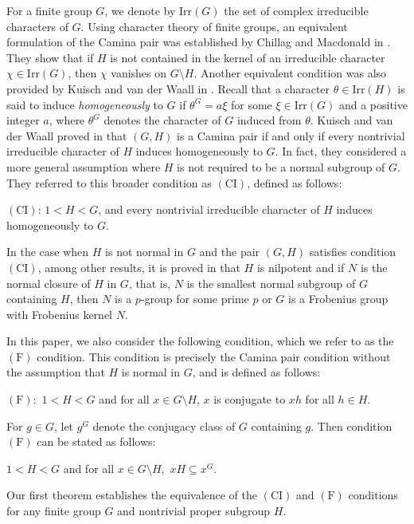 \documentclass[twoside,a4paper,reqno,11pt]{amsart}
\newcommand{\<}{\langle}
\renewcommand{\>}{\rangle}
\newcommand{\Irr}{\mathrm {Irr}}
\newcommand{\F}{\mathrm{(F)}}
\newcommand{\CI}{\mathrm{(CI)}}
\renewcommand{\:}{\colon}
\theoremstyle{definition}
\begin{document}
For a finite group $G$, we denote by $\Irr(G)$ the set of complex irreducible characters of $G$. Using character theory of finite groups, an equivalent formulation of the Camina pair was established by Chillag and Macdonald in \cite[Propsition 3.1]{Chillag-Macdonald}. They show that if $H$ is not contained in the kernel of an irreducible character $\chi\in\Irr(G)$, then $\chi$ vanishes on $G\setminus H$. Another equivalent condition was also provided by Kuisch and van der Waall in \cite{Kuisch-vanderWaall}. Recall that a character $\theta\in \Irr(H)$ is said to induce \emph{homogeneously} to $G$ if $\theta^G = a\xi$ for some $\xi\in \Irr(G)$ and a positive integer $a$, where $\theta^G$ denotes the character of $G$ induced from $\theta$. Kuisch and van der Waall proved in \cite[Lemma 2.1]{Kuisch-vanderWaall} that $(G,H)$ is a Camina pair if and only if every nontrivial irreducible character of $H$ induces homogeneously to $G$. 
In fact, they considered a more general assumption where $H$ is not required to be a normal subgroup of $G$. They referred to this broader condition as  $\CI$, defined as follows:

\smallskip
\noindent
{{$\CI$:} $1<H<G$, and every nontrivial irreducible character of $H$ induces homogeneously to $G$.}

\smallskip
In the case when $H$ is not normal in $G$ and the pair $(G,H)$ satisfies condition $\CI$, among other results, it is proved in \cite{Kuisch-vanderWaall} that $H$ is nilpotent and if $N$ is the normal closure of $H$ in $G$, that is, $N$ is the smallest normal subgroup of $G$ containing $H$, then $N$ is a $p$-group for some prime $p$ or $G$ is a Frobenius group with Frobenius kernel $N.$
 
 
 \smallskip
In this paper, we also consider the following condition, which we refer to as the $\F$ condition. This condition is precisely the Camina pair condition without the assumption that $H$ is normal in $G$, and is defined as follows:

\smallskip
\noindent
$\F:$ $1<H<G$ and for all $x\in G\setminus H$, $x$ is conjugate to $xh$ for all $h\in H$. 

For $g\in G$, let $g^G$ denote the conjugacy class of $G$ containing $g$. Then condition $\F$ can be stated as follows: 
\begin{center} $1<H<G$ and for all $x\in G\setminus H,$ $xH\subseteq x^G$. \end{center}
  
\smallskip
Our first theorem establishes the equivalence of the $\CI$ and $\F$ conditions for any finite group $G$ and nontrivial proper subgroup $H$.
\end{document}
